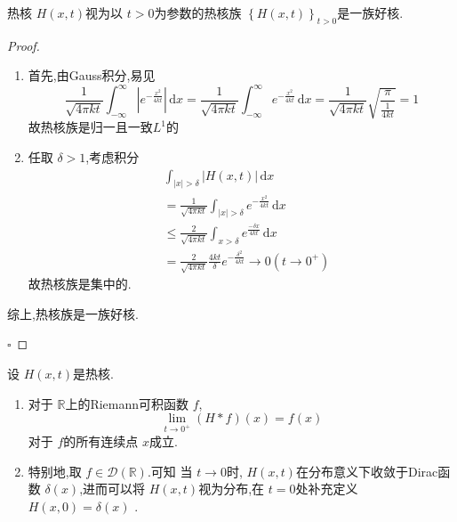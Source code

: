 \documentclass[../../main.tex]{subfiles}
\begin{document}
\begin{lemma}
    热核 \(  H\left( x,t \right)   \)视为以 \(  t> 0  \)为参数的热核族 \(  \left\{ H\left( x,t \right)  \right\}_{t> 0}  \)是一族好核.   
\end{lemma}
\begin{proof}
    \begin{enumerate}
        \item 首先,由Gauss积分,易见 \[
      \frac{1 }{\sqrt{4\pi kt} }\int_{-\infty}^{\infty}\left| e^{-\frac{x^{2} }{4kt } } \right|\,\mathrm{d} x=     \frac{1 }{\sqrt{4\pi kt} } \int_{-\infty}^{\infty}e^{-\frac{x^{2} }{4kt } }\,\mathrm{d} x= \frac{1 }{\sqrt{4\pi kt} }\sqrt{\frac{\pi  }{\frac{1 }{4kt }  } }= 1
        \]故热核族是归一且一致\(  L^{1}  \)的 
        \item 任取 \(   \delta > 1  \),考虑积分 \[
      \begin{aligned}
        &\int_{\left| x \right|>  \delta  } \left| H\left( x,t \right)  \right|\,\mathrm{d} x \\ 
         &=\frac{1 }{\sqrt{4\pi kt} }   \int_{\left| x \right|>  \delta  }e^{-\frac{x^{2} }{4kt } }\,\mathrm{d} x\\ 
          &\le \frac{2 }{\sqrt{4\pi kt} } \int_{x >  \delta  }e^{\frac{- \delta x  }{4kt } }\,\mathrm{d} x\\ 
           &= \frac{2 }{\sqrt{4\pi kt} } \frac{4kt }{ \delta  } e^{-\frac{ \delta ^{2} }{4kt } }\to 0\left( t\to 0^{+ } \right) 
      \end{aligned}
        \] 故热核族是集中的.
      
    \end{enumerate}
    综上,热核族是一族好核.

    \hfill $\square$
\end{proof}

\begin{proposition}
    设 \(  H\left( x,t \right)   \)是热核. 
    \begin{enumerate}
        \item 对于 \(  \mathbb{R}   \)上的Riemann可积函数 \(  f  \), \[
    \lim_{t \to 0^{+ }}\left( H*f \right)\left( x \right)= f\left( x \right)   
    \]对于 \(  f  \)的所有连续点 \(  x  \)成立.  
        \item 特别地,取 \(  f \in \mathcal{D}\left( \mathbb{R}  \right)   \).可知 当 \(  t \to 0  \)时, \(  H\left( x,t \right)   \)在分布意义下收敛于Dirac函数 \(   \delta \left( x \right)   \),进而可以将 \(  H\left( x,t \right)   \)视为分布,在 \(  t= 0  \)处补充定义 \(  H\left( x,0 \right)=  \delta \left( x \right)    \)   .   
    \end{enumerate}
    
\end{proposition}
\end{document}
